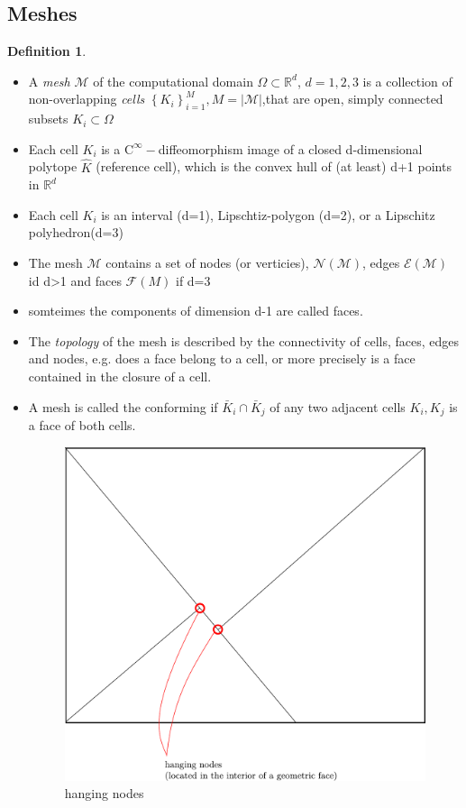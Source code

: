 \documentclass[english]{article}
\theoremstyle{definition}
\newtheorem*{defi}{Definition}
\theoremstyle{remark}
\newcommand{\M}{\mathcal{M}}
\newcommand{\N}{\mathcal{N}}
\newcommand{\E}{\mathcal{E}}
\newcommand{\RR}{\mathbb{R}}			%
\newcommand{\F}{\mathcal{F}}
\newcommand{\OO}{\Omega}
\newcommand{\cinf}{\tx{C}^\infty}
\newcommand{\tx}[1]{\text{#1}}
\begin{document}
\subsection{Meshes}
\begin{defi}
  \begin{itemize}
  \item A \emph{mesh} $\mathcal{M}$ of the computational domain $\OO\subset \RR^d$, $d=1,2,3$ is a collection of non-overlapping \emph{cells} $\left\{K_i \right\}^M_{i=1} , M = |\mathcal{M}|$,that are open, simply connected subsets $K_i \subset \OO$
  \item Each cell $K_i$ is a $\cinf-$diffeomorphism image of a closed d-dimensional polytope $\hat K$ (reference cell), which is the convex hull of (at least) d+1 points  in $\RR^d$\\
  \item Each cell $K_i$ is an interval (d=1), Lipschtiz-polygon (d=2), or a Lipschitz polyhedron(d=3)\\
  \item The mesh $\mathcal{M}$ contains a set of nodes (or verticies), $\N(\M)$, edges $\E(\M)$ id d>1 and faces $\F(M)$ if d=3\\
  \item somteimes the components of dimension d-1 are called faces.\\
  \item The \emph{topology} of the mesh is described by the connectivity of cells, faces, edges and nodes, e.g. does a face belong to a cell, or more precisely is a face contained in the closure of a cell.
  \item A mesh is called the conforming if $\bar K_i \cap \bar K_j$ of any two adjacent cells $K_i,K_j$ is a face of both cells.
    \begin{figure}[tbh]
      \begin{center}
        \includegraphics[width=\textwidth]{figs/hangingNodes.pdf}
      \end{center}
      \caption{hanging nodes}
      \label{hanging-nodes-figure}
    \end{figure}


\end{itemize}
\end{defi}
\end{document}
